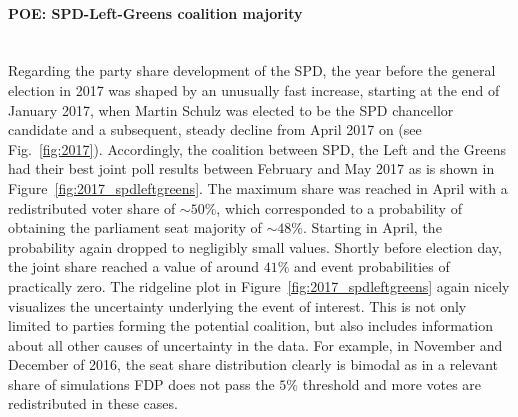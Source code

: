 \documentclass[smallcondensed]{svjour3}     %
\begin{document}
\paragraph{POE: SPD-Left-Greens coalition majority} \ \\
Regarding the party share development of the SPD, the year before
the general election in 2017 was shaped by an unusually fast increase, starting
at the end of January 2017, when Martin Schulz was elected to be the SPD chancellor
candidate and a subsequent, steady decline from April 2017 on (see Fig.~\ref{fig:2017}).
Accordingly, the coalition between SPD, the Left and the Greens had
their best joint poll results between February and May 2017 as is shown in
Figure~\ref{fig:2017_spdleftgreens}.
The maximum share was reached in April with a redistributed voter
share of $\sim 50\%$, which corresponded to a probability of obtaining the
parliament seat majority of $\sim 48\%$.
Starting in April, the probability again dropped to negligibly small values.
Shortly before election day, the joint share
reached a value of around $41\%$ and event probabilities of practically zero.
The ridgeline plot in Figure~\ref{fig:2017_spdleftgreens}
again nicely visualizes the uncertainty underlying the event of
interest. This is not only limited to parties forming the potential coalition,
but also includes information about all other causes of uncertainty in the data.
For example, in November and December of 2016, the seat share distribution clearly
is bimodal as in a relevant share of simulations FDP does not pass
the $5\%$ threshold and more votes are redistributed in these cases.
\end{document}
